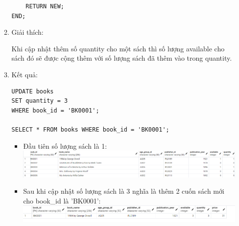 \documentclass[12pt]{article}
\begin{document}
\begin{enumerate}
\begin{enumerate}
\begin{lstlisting}
    RETURN NEW;
END;
        \end{lstlisting}
        \item Giải thích: 

        Khi cập nhật thêm số quantity cho một sách thì số lượng available cho sách đó sẽ được cộng thêm với số lượng sách đã thêm vào trong quantity. 
        \item Kết quả:
        \begin{lstlisting}
UPDATE books
SET quantity = 3
WHERE book_id = 'BK0001';

SELECT * FROM books WHERE book_id = 'BK0001'; 
    \end{lstlisting}
    \begin{itemize}
        \item Đầu tiên số lượng sách là 1:\\
        \includegraphics[width=1\linewidth]{dtb8.png}
        \item Sau khi cập nhật số lượng sách là 3 nghĩa là thêm 2 cuốn sách mới cho book\_id là 'BK0001':\\
        \includegraphics[width=1\linewidth]{dtb9.png}
    \end{itemize}
\end{enumerate}
\end{enumerate}
\end{document}
